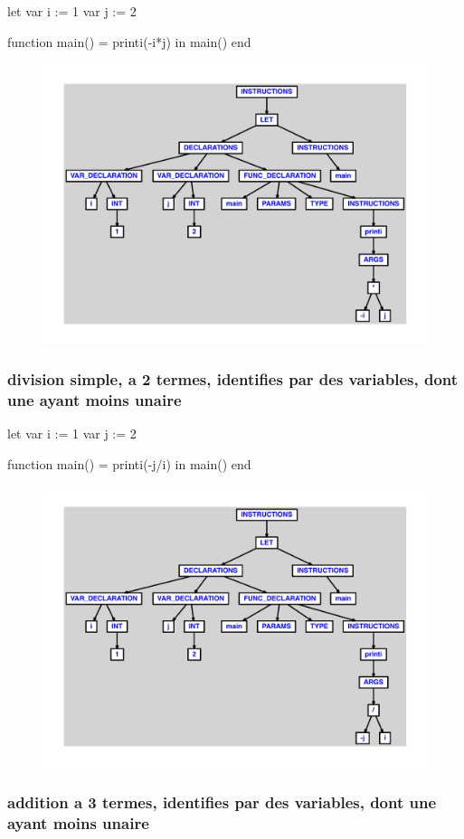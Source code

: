 \documentclass{article}
\begin{document}
\begin{verbatimtab}
let
	var i := 1
	var j := 2

	function main() = printi(-i*j)
in main() end
\end{verbatimtab}
\begin{figure}[H]\centering\includegraphics[max width=\textwidth]{ast/ast_77.pdf}\end{figure}\subsubsection{division simple, a 2 termes, identifies par des variables, dont une ayant moins unaire}
\begin{verbatimtab}
let
	var i := 1
	var j := 2

	function main() = printi(-j/i)
in main() end
\end{verbatimtab}
\begin{figure}[H]\centering\includegraphics[max width=\textwidth]{ast/ast_78.pdf}\end{figure}\subsubsection{addition a 3 termes, identifies par des variables, dont une ayant moins unaire}
\end{document}
